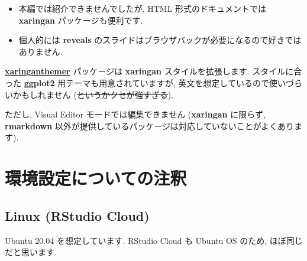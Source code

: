 \documentclass[
]{ltjsarticle}
\providecommand{\tightlist}{%
  \setlength{\itemsep}{0pt}\setlength{\parskip}{0pt}}
\begin{document}
\begin{itemize}
\tightlist
\item
  本編では紹介できませんでしたが, HTML 形式のドキュメントでは \textbf{xaringan} パッケージも便利です.
\item
  個人的には \textbf{reveals} のスライドはブラウザバックが必要になるので好きではありません.
\end{itemize}

\href{https://pkg.garrickadenbuie.com/xaringanthemer/}{\textbf{xaringanthemer}} パッケージは \textbf{xaringan} スタイルを拡張します. スタイルに合った \textbf{ggplot2} 用テーマも用意されていますが, 英文を想定しているので使いづらいかもしれません (\sout{というかクセが強すぎる}).

ただし, Visual Editor モードでは編集できません (\textbf{xaringan} に限らず, \textbf{rmarkdown} 以外が提供しているパッケージは対応していないことがよくあります).

\hypertarget{setup-notes}{%
\section{環境設定についての注釈}\label{setup-notes}}

\hypertarget{linux-rstudio-cloud}{%
\subsection{Linux (RStudio Cloud)}\label{linux-rstudio-cloud}}

Ubuntu 20.04 を想定しています. RStudio Cloud も Ubuntu OS のため, ほぼ同じだと思います.
\end{document}
